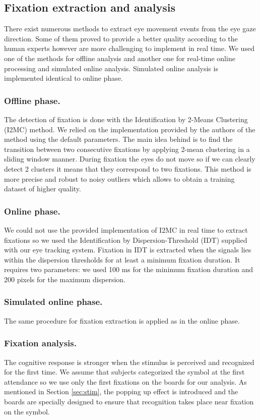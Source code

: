 \documentclass[12pt]{iopart}
\begin{document}
\subsection{Fixation extraction and analysis}
There exist numerous methods to extract eye movement events
from the eye gaze direction. Some of them proved to provide
a better quality according to the human experts
however are more challenging to implement in real time.
We used one of the methods for offline analysis and another one
for real-time online processing and simulated online analysis.
Simulated online analysis is implemented identical to online phase.


\subsubsection*{Offline phase.}
The detection of fixation is done with the Identification by 2-Means Clustering (I2MC) method.
We relied on the implementation provided by the authors of the method
using the default parameters.
The main idea behind is to find the transition between two consecutive fixations
by applying 2-mean clustering in a sliding window manner.
During fixation the eyes do not move so if we can clearly detect
2 clusters it means that they correspond to two fixations.
This method is more precise and robust to noisy outliers which
allows to obtain a training dataset of higher quality.

\subsubsection*{Online phase.}
We could not use the provided implementation of I2MC in real time
to extract fixations so we used the Identification by Dispersion-Threshold (IDT)
supplied with our eye tracking system. Fixation in IDT is extracted
when the signals lies within the dispersion thresholds for at least a minimum fixation duration.
It requires two parameters: we used 100 ms for the minimum fixation duration
and 200 pixels for the maximum dispersion.

\subsubsection*{Simulated online phase.}
The same procedure for fixation extraction is applied as in the online phase.

\subsubsection*{Fixation analysis.}
\label{sec:fixanal}
The cognitive response is stronger when the stimulus is perceived and recognized
for the first time. 
We assume that subjects categorized the symbol at the first
attendance so we use only the first fixations on the boards for our analysis.
As mentioned in Section \ref{sec:stim}, the popping up effect is introduced 
and the boards are specially designed to ensure that
recognition takes place near fixation on the symbol.
\end{document}
